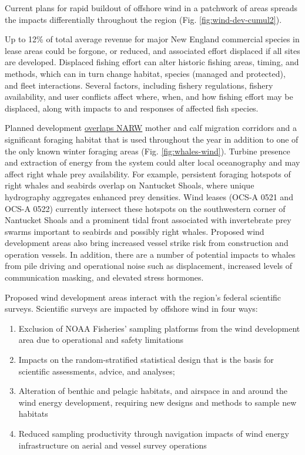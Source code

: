 \documentclass[
  10pt,
]{article}
\providecommand{\tightlist}{%
  \setlength{\itemsep}{0pt}\setlength{\parskip}{0pt}}
\begin{document}
Current plans for rapid buildout of offshore wind in a patchwork of areas spreads the impacts differentially throughout the region (Fig. \ref{fig:wind-dev-cumul2}).

Up to 12\% of total average revenue for major New England commercial species in lease areas could be forgone, or reduced, and associated effort displaced if all sites are developed. Displaced fishing effort can alter historic fishing areas, timing, and methods, which can in turn change habitat, species (managed and protected), and fleet interactions. Several factors, including fishery regulations, fishery availability, and user conflicts affect where, when, and how fishing effort may be displaced, along with impacts to and responses of affected fish species.

Planned development \href{https://noaa-edab.github.io/catalog/persistent_hotspots.html}{overlaps NARW} mother and calf migration corridors and a significant foraging habitat that is used throughout the year in addition to one of the only known winter foraging areas (Fig. \ref{fig:whales-wind}). Turbine presence and extraction of energy from the system could alter local oceanography and may affect right whale prey availability. For example, persistent foraging hotspots of right whales and seabirds overlap on Nantucket Shoals, where unique hydrography aggregates enhanced prey densities. Wind leases (OCS-A 0521 and OCS-A 0522) currently intersect these hotspots on the southwestern corner of Nantucket Shoals and a prominent tidal front associated with invertebrate prey swarms important to seabirds and possibly right whales. Proposed wind development areas also bring increased vessel strike risk from construction and operation vessels. In addition, there are a number of potential impacts to whales from pile driving and operational noise such as displacement, increased levels of communication masking, and elevated stress hormones.

Proposed wind development areas interact with the region's federal scientific surveys. Scientific surveys are impacted by offshore wind in four ways:

\begin{enumerate}
\def\labelenumi{\arabic{enumi}.}
\tightlist
\item
  Exclusion of NOAA Fisheries' sampling platforms from the wind development area due to operational and safety limitations
\item
  Impacts on the random-stratified statistical design that is the basis for scientific assessments, advice, and analyses;
\item
  Alteration of benthic and pelagic habitats, and airspace in and around the wind energy development, requiring new designs and methods to sample new habitats
\item
  Reduced sampling productivity through navigation impacts of wind energy infrastructure on aerial and vessel survey operations
\end{enumerate}
\end{document}
